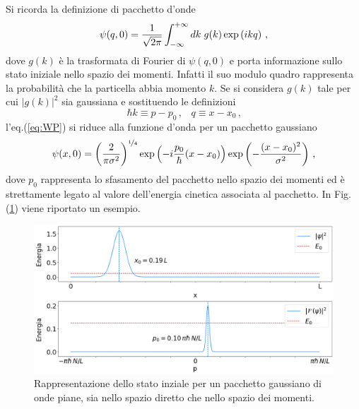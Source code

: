 \documentclass[12pt]{report}
\begin{document}
Si ricorda la definizione di pacchetto d'onde
\begin{equation}
    \centering
    \psi(q, 0) = \frac{1}{\sqrt{2 \pi}} \int_{- \infty}^{+ \infty} dk \; g(k) \exp \left(ikq\right) \, \text{,}
    \label{eq:WP}
\end{equation}
dove $g(k)$ è la trasformata di Fourier di $\psi(q, 0)$ e porta informazione sullo stato iniziale nello spazio dei momenti. Infatti il suo modulo quadro rappresenta la probabilità che la particella abbia momento $k$.
Se si considera $g(k)$ tale per cui $|g(k)|^2$ sia gaussiana e sostituendo le definizioni
\begin{equation}
    \hbar k \equiv p - p_0 \, \text{,}   \quad q \equiv x - x_0 \, \text{,}
    \label{eq:def_kq}
\end{equation}
l'eq.(\ref{eq:WP}) si riduce alla funzione d'onda per un pacchetto gaussiano 
\begin{equation}
    \centering
    \psi(x, 0) = \left( \frac{2}{ \pi \sigma^2} \right)^{\nicefrac{1}{4}} \exp \left(-i \frac{p_{0}}{\hbar} (x -x_0)\right) \exp \left(-\frac{(x -x_0)^2}{\sigma^{2}}\right) \, \text{,}
    \label{eq:WP_gaus}
\end{equation}
dove $p_0$ rappresenta lo sfasamento del pacchetto nello spazio dei momenti ed è strettamente legato al valore dell'energia cinetica associata al pacchetto. %
In Fig.({\ref{fig:free_p_view}}) viene riportato un esempio.

\begin{figure}
    \centering
    \includegraphics[width = \textwidth]{immagini/free_p_view.png}
    \caption{ \textcolor{dark-gray}{Rappresentazione dello stato inziale per un pacchetto gaussiano di onde piane, sia nello spazio diretto che nello spazio dei momenti.}}
    \label{fig:free_p_view}
\end{figure}
\end{document}
